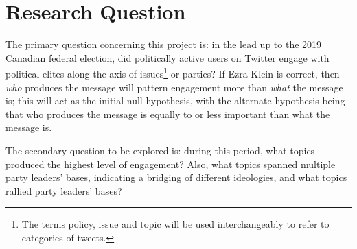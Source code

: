 \section{Research Question}

The primary question concerning this project is: in the lead up to the 2019
Canadian federal election, did politically active users on Twitter engage with
political elites along the axis of issues\footnote{The terms policy, issue and topic will be used interchangeably to
refer to categories of tweets.} or parties? If Ezra Klein is correct, then \emph{who} produces the
message will pattern engagement more than \emph{what} the message is; this will
act as the initial null hypothesis, with the alternate hypothesis being that who
produces the message is equally to or less important than what the message is. 

The secondary question to be explored is: during this period, what topics
produced the highest level of engagement? Also, what topics spanned
multiple party leaders' bases, indicating a bridging of different ideologies,
and what topics rallied party leaders' bases?